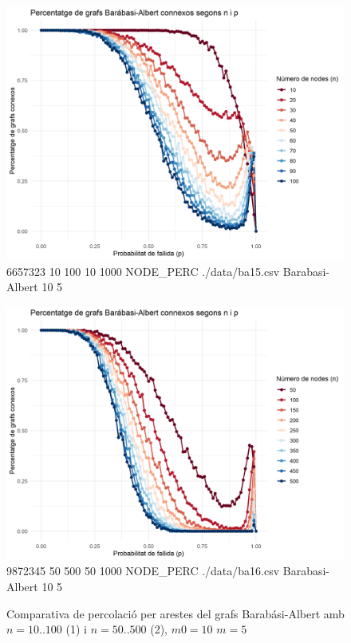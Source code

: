 \documentclass[a4paper]{article}
\begin{document}
	\begin{figure}[H]
		\centering
		\begin{minipage}{0.45\textwidth}
			\centering
			\includegraphics[width=\textwidth]{images/barabasi_10-100_10_5}
			\footnotesize{6657323 10 100 10 1000 NODE\_PERC ./data/ba15.csv Barabasi-Albert 10 5}
		\end{minipage}
		\hfill
		\begin{minipage}{0.45\textwidth}
			\centering
			\includegraphics[width=\textwidth]{images/barabasi_50-500_10_5}
			\footnotesize{9872345 50 500 50 1000 NODE\_PERC ./data/ba16.csv Barabasi-Albert 10 5}
		\end{minipage}
		\caption{Comparativa de percolació per arestes del grafs Barabási-Albert amb $n = 10..100$ (1) i $n = 50..500$ (2), $m0 = 10$ $m = 5$}
		\label{fig:percolation_nodes_ba_10_x}
	\end{figure}
	
\end{document}
